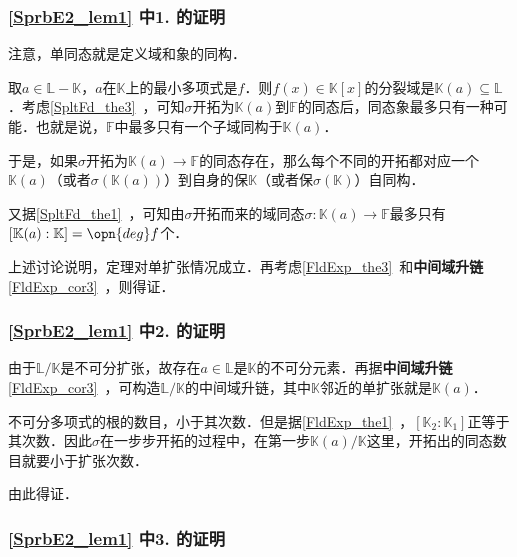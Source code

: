 \subsubsection{\autoref{SprbE2_lem1} 中1. 的证明}



注意，单同态就是定义域和象的同构．

取$a\in\mathbb{L}-\mathbb{K}$，$a$在$\mathbb{K}$上的最小多项式是$f$．则$f(x)\in\mathbb{K}[x]$的分裂域是$\mathbb{K}(a)\subseteq\mathbb{L}$．考虑\autoref{SpltFd_the3}~，可知$\sigma$开拓为$\mathbb{K}(a)$到$\mathbb{F}$的同态后，同态象最多只有一种可能．也就是说，$\mathbb{F}$中最多只有一个子域同构于$\mathbb{K}(a)$．

于是，如果$\sigma$开拓为$\mathbb{K}(a)\to\mathbb{F}$的同态存在，那么每个不同的开拓都对应一个$\mathbb{K}(a)$（或者$\sigma(\mathbb{K}(a))$）到自身的保$\mathbb{K}$（或者保$\sigma(\mathbb{K})$）自同构．

又据\autoref{SpltFd_the1}~，可知由$\sigma$开拓而来的域同态$\sigma:\mathbb{K}(a)\to\mathbb{F}$最多只有$[\mathbb{K}(a):\mathbb{K}]=\opn{deg}f$个．

上述讨论说明，定理对单扩张情况成立．再考虑\autoref{FldExp_the3}~和\textbf{中间域升链}\autoref{FldExp_cor3}~，则得证．



\subsubsection{\autoref{SprbE2_lem1} 中2. 的证明}

由于$\mathbb{L}/\mathbb{K}$是不可分扩张，故存在$a\in\mathbb{L}$是$\mathbb{K}$的不可分元素．再据\textbf{中间域升链}\autoref{FldExp_cor3}~，可构造$\mathbb{L}/\mathbb{K}$的中间域升链，其中$\mathbb{K}$邻近的单扩张就是$\mathbb{K}(a)$．

不可分多项式的根的数目，小于其次数．但是据\autoref{FldExp_the1}~，$[\mathbb{K}_2:\mathbb{K}_1]$正等于其次数．因此$\sigma$在一步步开拓的过程中，在第一步$\mathbb{K}(a)/\mathbb{K}$这里，开拓出的同态数目就要小于扩张次数．

由此得证．


\subsubsection{\autoref{SprbE2_lem1} 中3. 的证明}


